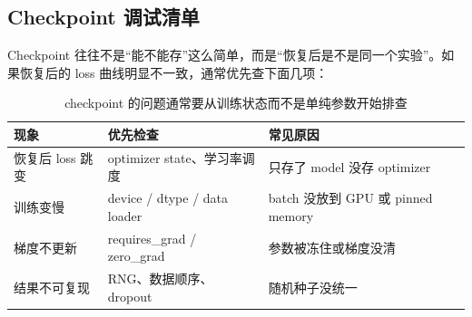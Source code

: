 \subsection{Checkpoint 调试清单}

Checkpoint 往往不是“能不能存”这么简单，而是“恢复后是不是同一个实验”。如果恢复后的 loss 曲线明显不一致，通常优先查下面几项：

\begin{table}[H]
\centering
\begin{tabular}{p{}p{}p{}}
\toprule
\textbf{现象} & \textbf{优先检查} & \textbf{常见原因} \\
\midrule
恢复后 loss 跳变 & optimizer state、学习率调度 & 只存了 model 没存 optimizer \\
训练变慢 & device / dtype / data loader & batch 没放到 GPU 或 pinned memory \\
梯度不更新 & requires\_grad / zero\_grad & 参数被冻住或梯度没清 \\
结果不可复现 & RNG、数据顺序、dropout & 随机种子没统一 \\
\bottomrule
\end{tabular}
\caption{checkpoint 的问题通常要从训练状态而不是单纯参数开始排查}
\end{table}

